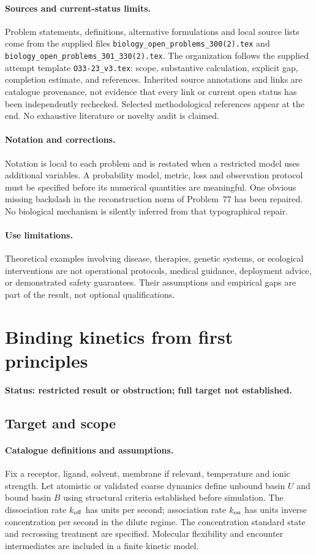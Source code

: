 \documentclass[11pt]{article}
\begin{document}
\paragraph{Sources and current-status limits.}
Problem statements, definitions, alternative formulations and local source lists
come from the supplied files
\texttt{biology\_open\_problems\_300(2).tex} and
\texttt{biology\_open\_problems\_301\_330(2).tex}.
The organization follows the supplied attempt template
\texttt{O33-23\_v3.tex}: scope, substantive calculation, explicit gap,
completion estimate, and references. Inherited source annotations and links are
catalogue provenance, not evidence that every link or current open status has
been independently rechecked. Selected methodological references appear at the
end. No exhaustive literature or novelty audit is claimed.

\paragraph{Notation and corrections.}
Notation is local to each problem and is restated when a restricted model uses
additional variables. A probability model, metric, loss and observation protocol
must be specified before its numerical quantities are meaningful. One obvious
missing backslash in the reconstruction norm of Problem~77 has been repaired.
No biological mechanism is silently inferred from that typographical repair.

\paragraph{Use limitations.}
Theoretical examples involving disease, therapies, genetic systems, or ecological
interventions are not operational protocols, medical guidance, deployment advice,
or demonstrated safety guarantees. Their assumptions and empirical gaps are part
of the result, not optional qualifications.


\section*{Binding kinetics from first principles}
\label{prob:083}
\noindent\textbf{Status: restricted result or obstruction; full target not established.}
\subsection{Target and scope}
\paragraph{Catalogue definitions and assumptions.}
Fix a receptor, ligand, solvent, membrane if relevant, temperature and ionic strength. Let atomistic or validated coarse dynamics define unbound basin $U$ and bound basin $B$ using structural criteria established before simulation. The dissociation rate $k_{\rm off}$ has units per second; association rate $k_{\rm on}$ has units inverse concentration per second in the dilute regime. The concentration standard state and recrossing treatment are specified. Molecular flexibility and encounter intermediates are included in a finite kinetic model.
\end{document}
